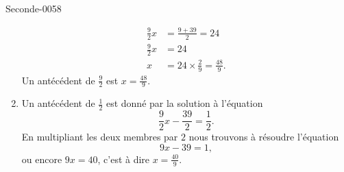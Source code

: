\begin{corrige}{Seconde-0058}
\begin{enumerate}
\begin{subequations}
\begin{align}
                    \frac{ 9 }{2}x&=\frac{ 9+39 }{2}=24\\
                    \frac{ 9 }{2}x&=24\\
                    x&=24\times \frac{ 2 }{ 9 }=\frac{ 48 }{ 9 }.
                \end{align}
            \end{subequations}
            Un antécédent de \( \frac{ 9 }{2}\) est \( x=\frac{ 48 }{ 9 }\).
        \item
            Un antécédent de \( \frac{ 1 }{2}\) est donné par la solution à l'équation
            \begin{equation}
                \frac{ 9 }{2}x-\frac{ 39 }{2}=\frac{ 1 }{2}.
            \end{equation}
            En multipliant les deux membres par \( 2\) nous trouvons à résoudre l'équation
            \begin{equation}
                9x-39=1,
            \end{equation}
            ou encore \( 9x=40\), c'est à dire \( x=\frac{ 40 }{ 9 }\).
    \end{enumerate}

\end{corrige}

